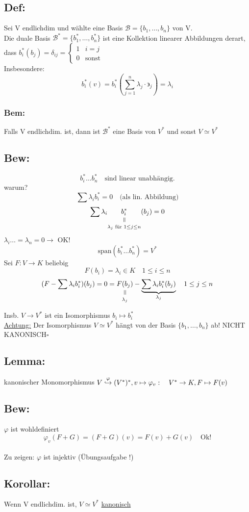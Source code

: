\documentclass[titlepage,12pt,a4paper,ngerman]{report}
\newenvironment{bew}[1]{\subsection{Bew: #1}}{\hfill$\square$}
\newcommand{\Bew}[2]{\begin{bew}{#1}#2\end{bew}}
\newcommand{\verteq}{\rotatebox{90}{$\,=$}}
\newcommand{\equalto}[2]{\underset{\scriptstyle\overset{\mkern4mu\verteq}{#2}}{#1}}
\newcommand{\tx}[1]{\textrm{#1}}
\newcommand{\casess}[4]{\left\{ \begin{array}{ll} {#1} & {#2} \\ {#3} & {#4} \end{array} \right.}
\begin{document}
\subsection{Def:} Sei V endlichdim und wählte eine Basis $ \mathcal{B} = \{ b_1,\dots,b_n\} $ von  V.\\
Die duale Basis $ \mathcal{B}^* = \{b_1^*,\dots,b_n^*\} $ ist eine Kollektion linearer Abbildungen derart, dass $ b^*_i (b_j) = \delta_{ij} = \casess{1}{i=j}{0}{\tx{sonst}} $\\
Insbesondere:
$$b^*_i(v) = b_i^* (\sum_{j=1}^{n} \lambda_j \cdot \backepsilon_j) = \lambda_i$$
\subsubsection*{Bem:} Falls V endlichdim. ist, dann ist $ \mathcal{B}^*  $ eine Basis von $ V^* $ und sonst $ V\simeq V^* $

\Bew{}{
	$$b_i^* \dots b_n^* \quad \tx{sind linear unabhängig.}$$
	warum? $$\sum \lambda_i b_i^* = 0 \quad \tx{(als lin. Abbildung)}$$
	$$\sum \lambda_i \equalto{b_i^*}{\lambda_j \tx{ für } 1 \leq j \leq n}  (b_j) =0$$ 
	$\lambda_i \dots = \lambda_n = 0 \rightarrow$ OK!
	$$\tx{span}(b_i^* \dots b_n^*) = V^*$$
	Sei $F: V \to K$ beliebig 
	$$F(b_i) = \lambda_i \in K \quad 1 \leq i \leq n$$
	$$(F- \sum \lambda_i b_i^*) ( b_j) = 0 = \equalto{F(b_j)}{\lambda_j} - \underbrace{\sum \lambda_i b_i^* (b_j)}_{\lambda_j} \quad 1 \leq j \leq n$$
	
	Insb. $ V\to V^* $ ist ein Isomorphismus $  b_i \mapsto b_i^* $\\
	\underline{Achtung:} Der Isomorphismus $ V\simeq V^* $ hängt von der Basis $ \{b_1,\dots,b_n\} $ ab! NICHT KANONISCH}
\subsection{Lemma:} 
kanonischer Monomorphismus $ V \buildrel \varphi \over \hookrightarrow (V^*)^* , v \mapsto \varphi_v:\quad V^* \to K , F \mapsto F(v)$ 
\subsection{Bew:} $ \varphi $ ist wohldefiniert 
$$ \varphi_v(F+G) = (F+G) (v) = F(v)+ G(v) \quad \tx{Ok!}$$\\
Zu zeigen: $ \varphi $ ist injektiv (Übungsaufgabe !)
\subsection{Korollar:} Wenn V endlichdim. ist, $ V \simeq V^* $ \underline{kanonisch}
\end{document}
